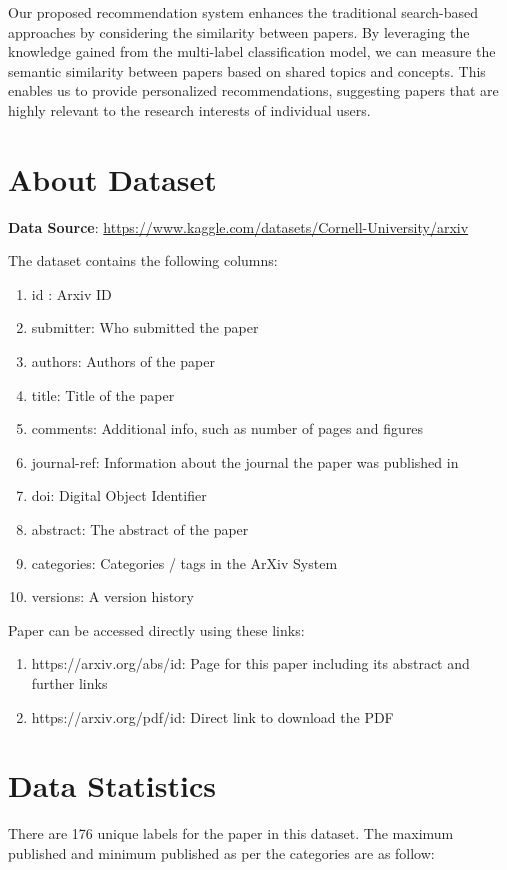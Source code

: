 Our proposed recommendation system enhances the traditional search-based approaches by considering the similarity between papers. By leveraging the knowledge gained from the multi-label classification model, we can measure the semantic similarity between papers based on shared topics and concepts. This enables us to provide personalized recommendations, suggesting papers that are highly relevant to the research interests of individual users.


\section{About Dataset}
\textbf{Data Source}: \href{https://www.kaggle.com/datasets/Cornell-University/arxiv}{https://www.kaggle.com/datasets/Cornell-University/arxiv}

The dataset contains the following columns:
\begin{enumerate}
    \item id : Arxiv ID 
    \item submitter: Who submitted the paper 
    \item authors: Authors of the paper
    \item title: Title of the paper 
    \item comments: Additional info, such as number of pages and figures 
    \item journal-ref: Information about the journal the paper was published in 
    \item doi: Digital Object Identifier 
    \item abstract: The abstract of the paper 
    \item categories: Categories / tags in the ArXiv System 
    \item versions: A version history
\end{enumerate}

Paper can be accessed directly using these links:
\begin{enumerate}
    \item https://arxiv.org/abs/{id}: Page for this paper including its abstract and further links
    \item https://arxiv.org/pdf/{id}: Direct link to download the PDF
\end{enumerate}


\section{Data Statistics}
There are 176 unique labels for the paper in this dataset. The maximum published and minimum published as per the categories are as follow:

